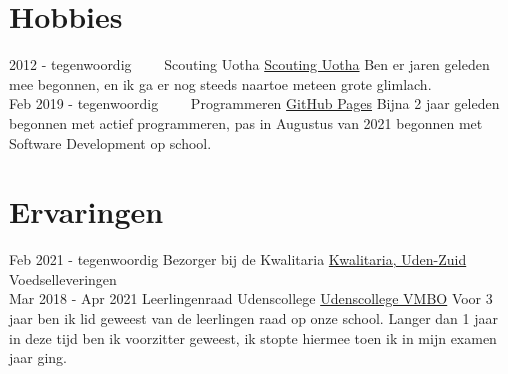 \documentclass[letterpaper]{twentysecondcv} %
\begin{document}
\section{Hobbies}

\begin{twenty} %
	\twentyitem
    	{2012 -}
        {tegenwoordig~~~~}
        {Scouting Uotha}
        {\href{https://www.uotha.nl/}{Scouting Uotha}}
        {}
            { Ben er jaren geleden mee begonnen, en ik ga er nog steeds naartoe meteen grote glimlach.}\\
	\twentyitem
    	{Feb 2019 -}
        {tegenwoordig~~~~}
        {Programmeren}
        {\href{https://tais993.github.io/}{GitHub Pages}}
        {}
        {Bijna 2 jaar geleden begonnen met actief programmeren, pas in Augustus van 2021 begonnen met Software Development op school.}
\end{twenty}

\vspace{6mm}



\section{Ervaringen}
\begin{twenty} %
	\twentyitem
    		{Feb 2021 -}
		{tegenwoordig}
        		{Bezorger bij de Kwalitaria}
        		{\href{https://kwalitaria.nl/uden-zuid/uden-zuid/}{Kwalitaria, Uden-Zuid}}
        		{}
        		{Voedselleveringen}\\
		\twentyitem
    		{Mar 2018 -}
		{Apr 2021}
        		{Leerlingenraad Udenscollege}
        		{\href{https://www.udenscollege.nl/vmbo/startpagina-vmbo/}{Udenscollege VMBO}}
        		{}
        		{
        		    Voor 3 jaar ben ik lid geweest van de leerlingen raad op onze school.
        		    Langer dan 1 jaar in deze tijd ben ik voorzitter geweest, ik stopte hiermee toen ik in mijn examen jaar ging.
        		}
\end{twenty}

\vspace{6mm}


\end{document}
